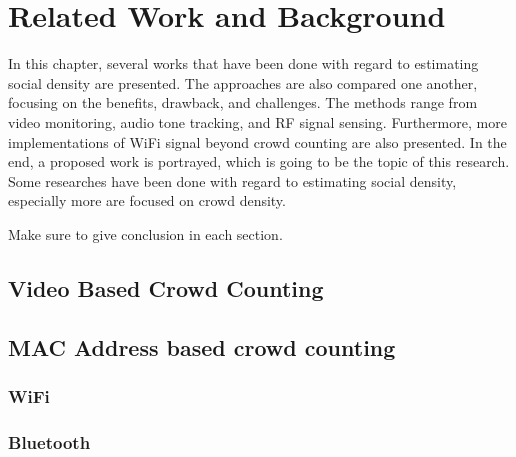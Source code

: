 \chapter{Related Work and Background}\label{ch:related-work}


In this chapter, several works that have been done with regard to estimating social density are presented. The approaches are also compared one another, focusing on the benefits, drawback, and challenges. The methods range from video monitoring, audio tone tracking, and RF signal sensing. Furthermore, more implementations of WiFi signal beyond crowd counting are also presented. In the end, a proposed work is portrayed, which is going to be the topic of this research.
Some researches have been done with regard to estimating social density, especially more are focused on crowd density.

Make sure to give conclusion in each section.

\section{Video Based Crowd Counting} %
\label{sec:video_based_crowd_counting}




\section{MAC Address based crowd counting} %
\label{sec:mac_address_based_crowd_counting}

\subsection{WiFi} %
\label{sub:wifi}


\subsection{Bluetooth} %
\label{sub:bluetooth}

